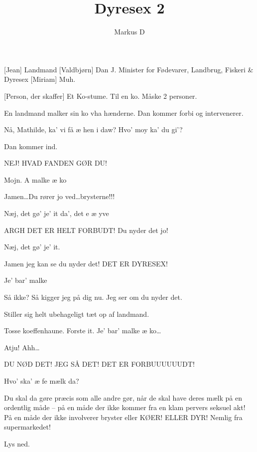 \documentclass[a4paper,11pt]{article}
\title{Dyresex 2}
\author{Markus D}
\begin{document}
\maketitle

\begin{roles}
    [Jean] Landmand
    [Valdbjørn] Dan J. Minister for Fødevarer, Landbrug, Fiskeri \& Dyresex
    [Miriam] Muh.
\end{roles}

\begin{props}
    [Person, der skaffer] Et Ko-stume. Til en ko. Måske 2 personer.
\end{props}


\begin{sketch}

\scene En landmand malker sin ko vha hænderne. Dan kommer forbi og intervenerer.


 Nå, Mathilde, ka' vi få æ hen i daw? Hvo' moy ka' du gi'?

\scene Dan kommer ind.

 NEJ! HVAD FANDEN GØR DU! 

 Mojn. A malke æ ko


 Jamen\ldots Du rører jo ved\ldots brysterne!!!

 Næj, det gø' je' it da', det e æ yve

 ARGH DET ER HELT FORBUDT! Du nyder det jo!

 Næj, det gø' je' it.

 Jamen jeg kan se du nyder det! DET ER DYRESEX!

  Je' bar' malke

 Så ikke? Så kigger jeg på dig nu. Jeg ser om du nyder det.

Stiller sig helt ubehageligt tæt op af landmand.

 Tosse koeffenhaune. Forste it. Je' bar' malke æ ko\ldots {}

 Atju! Ahh\ldots

 DU NØD DET! JEG SÅ DET! DET ER FORBUUUUUUDT! 

 Hvo' ska' æ fe mælk da?

 Du skal da gøre præcis som alle andre gør, når de skal have deres mælk på en ordentlig måde -- på en måde der ikke kommer fra en klam pervers seksuel akt! På en måde der ikke involverer bryster eller KØER! ELLER DYR! Nemlig fra supermarkedet!

\scene Lys ned.

\end{sketch}
\end{document}
